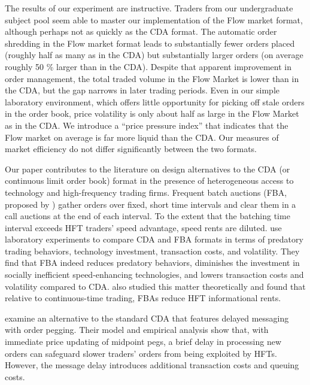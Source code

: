 \documentclass[12pt]{article}
\begin{document}
The results of our experiment are instructive. 
Traders from our undergraduate subject pool seem able to master our implementation of the Flow market format, although perhaps not as quickly as the CDA format. 
The automatic order shredding in the Flow market format leads to substantially fewer orders placed (roughly half as many as in the CDA) but substantially larger orders (on average roughly 50 \% larger than in the CDA). 
Despite that apparent improvement in order management, the total traded volume in the Flow Market is lower than in the CDA, but the gap narrows in later trading periods.
Even in our simple laboratory environment, which offers little opportunity for picking off stale orders in the order book, price volatility is only about half as large in the  Flow Market as in the CDA. 
We introduce a ``price pressure index'' that indicates that the Flow market on average is far more liquid than the CDA.
Our measures of market efficiency do not differ significantly between the two formats.
 

Our paper contributes to the literature on design alternatives to the CDA (or continuous limit order book)  format in the presence of heterogeneous access to technology and high-frequency trading firms. 
Frequent batch auctions (FBA, proposed by \citealp{Budish2015}) gather orders over fixed, short time intervals and clear them in a call auctions at the end of each interval. To the extent that the batching time interval exceeds HFT traders' speed advantage, speed rents are diluted. \cite{Aldrich2019} use laboratory experiments to
compare CDA and FBA formats in terms of predatory trading behaviors, technology investment, transaction costs, and volatility. They find that FBA indeed reduces predatory behaviors, diminishes the investment in socially inefficient speed-enhancing technologies, and lowers transaction costs and volatility compared to CDA. \cite{Haas2021} also studied this matter theoretically and found that relative to continuous-time trading, FBAs reduce HFT informational rents.

\cite{Aldrich2022} examine an alternative to the standard CDA that features delayed messaging with order pegging.  %
Their model and empirical analysis show that, with immediate price updating of midpoint pegs, a brief delay in processing new orders  can safeguard slower traders' orders from being exploited by HFTs. However, the message delay introduces additional transaction costs and queuing costs. 
\end{document}
